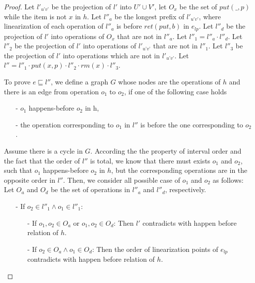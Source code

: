 \begin {proof}
Let $l'_{\textit{u'v'}}$ be the projection of $l'$ into $U' \cup V'$, let $O_x$ be the set of $\textit{put}(\_,p)$ while the item is not $x$ in $h$. Let $l''_a$ be the longest prefix of $l'_{\textit{u'v'}}$, where linearization of each operation of $l''_a$ is before $\textit{ret}(\textit{put},b)$ in $e_{\textit{lp}}$. Let $l''_d$ be the projection of $l'$ into operations of $O_x$ that are not in $l''_a$. Let $l''_1 = l''_a \cdot l''_d$. Let $l''_2$ be the projection of $l'$ into operations of $l'_{\textit{u'v'}}$ that are not in $l''_1$. Let $l''_3$ be the projection of $l'$ into operations which are not in $l'_{\textit{u'v'}}$. Let $l'' = l''_1 \cdot \textit{put}(x,p) \cdot l''_2 \cdot \textit{rm}(x) \cdot l''_3$.

To prove $e \sqsubseteq l''$, we define a graph $G$ whose nodes are the operations of $h$ and there is an edge from operation $o_1$ to $o_2$, if one of the following case holds

\begin{itemize}
\setlength{\itemsep}{0.5pt}
\item[-] $o_1$ happens-before $o_2$ in h,

\item[-] the operation corresponding to $o_1$ in $l''$ is before the one corresponding to $o_2$.
\end{itemize}

Assume there is a cycle in $G$. According the the property of interval order and the fact that the order of $l''$ is total, we know that there must exists $o_1$ and $o_2$, such that $o_1$ happens-before $o_2$ in $h$, but the corresponding operations are in the opposite order in $l''$. Then, we consider all possible case of $o_1$ and $o_2$ as follows: Let $O_a$ and $O_d$ be the set of operations in $l''_a$ and $l''_d$, respectively.

\begin{itemize}
\setlength{\itemsep}{0.5pt}
\item[-] If $o_2 \in l''_1 \wedge o_1 \in l''_1$:
    \begin{itemize}
    \setlength{\itemsep}{0.5pt}
    \item[-] If $o_1,o_2 \in O_a$ or $o_1,o_2 \in O_d$: Then $l'$ contradicts with happen before relation of $h$.

    \item[-] If $o_2 \in O_a \wedge o_1 \in O_d$: Then the order of linearization points of $e_{\textit{lp}}$ contradicts with happen before relation of $h$.
    \end{itemize}


\end{itemize}
\end{proof}
